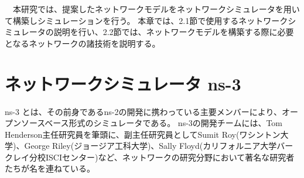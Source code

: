 \begin{comment}
QoE（Quality of Experience）とは，ユーザの満足レベルを定量的に示す指標である．この指標は，ネットワーク自体ではなくその上で提供されるIPTV等のアプリケーションサービスの体感品質のことである．たとえば，IPTVサービスの場合映像・音声の品質，チャンネルの切替え・早送り巻戻しなどのスムーズさ，その他使い勝手全般がQoEとなる．
QoS同様，QoEは評価項目を可能な限り数値指標として記述される．QoEは，ユーザ自身があるサービスについて評価を行い，その評価を数値として可視化したものがQoEとなる．QoSはネットワーク性能を，QoEはユーザーの体感品質をそれぞれ対象とする．つまり，QoS は通信事業者やサービス提供者から見たサービス品質の尺度であり，QoE はユーザーから見たサービス品質の尺度となる\cite{QoE}．
\end{comment}


　本研究では、提案したネットワークモデルをネットワークシミュレータを用いて構築しシミュレーションを行う。
本章では、2.1節で使用するネットワークシミュレータの説明を行い、2.2節では、ネットワークモデルを構築する際に必要となるネットワークの諸技術を説明する。

\section{ネットワークシミュレータ ns-3}

ns-3\cite{ns3} \cite{ns3text} とは、その前身であるns-2の開発に携わっている主要メンバーにより、オープンソースベース形式のシミュレータである。
ns-3の開発チームには、Tom Henderson主任研究員を筆頭に、副主任研究員としてSumit Roy(ワシントン大学)、George Riley(ジョージア工科大学)、Sally Floyd(カリフォルニア大学バークレイ分校ISCIセンター)など、ネットワークの研究分野において著名な研究者たちが名を連ねている。


